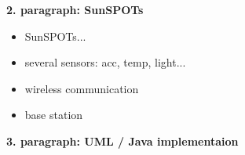 \documentclass[12pt]{scrartcl}
\begin{document}


\textbf{2. paragraph: SunSPOTs}

\begin{itemize}
\item SunSPOTs...
\item several sensors: acc, temp, light...
\item wireless communication
\item base station
\end{itemize}



\textbf{3. paragraph: UML / Java implementaion}

%
%
%
%
%

\newpage
\end{document}
